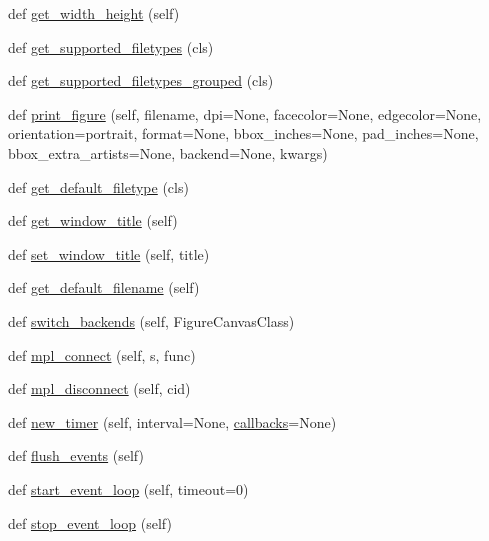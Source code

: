 \begin{DoxyCompactItemize}
\item 
def \hyperlink{classmatplotlib_1_1backend__bases_1_1FigureCanvasBase_a4db06231bf4e60e5192fe7675073c738}{get\+\_\+width\+\_\+height} (self)
\item 
def \hyperlink{classmatplotlib_1_1backend__bases_1_1FigureCanvasBase_aa11460e76b6d77d7bb916006d42d7244}{get\+\_\+supported\+\_\+filetypes} (cls)
\item 
def \hyperlink{classmatplotlib_1_1backend__bases_1_1FigureCanvasBase_a30987b6730be81ad4858f80d32fcf74b}{get\+\_\+supported\+\_\+filetypes\+\_\+grouped} (cls)
\item 
def \hyperlink{classmatplotlib_1_1backend__bases_1_1FigureCanvasBase_a06fd5e9dff8de0b56e06d47b314decd2}{print\+\_\+figure} (self, filename, dpi=None, facecolor=None, edgecolor=None, orientation=\textquotesingle{}portrait\textquotesingle{}, format=None, bbox\+\_\+inches=None, pad\+\_\+inches=None, bbox\+\_\+extra\+\_\+artists=None, backend=None, kwargs)
\item 
def \hyperlink{classmatplotlib_1_1backend__bases_1_1FigureCanvasBase_ab5e20184eb2d8f7c54dd90ada025a970}{get\+\_\+default\+\_\+filetype} (cls)
\item 
def \hyperlink{classmatplotlib_1_1backend__bases_1_1FigureCanvasBase_a4561b78c20faaffa400447c617a55efb}{get\+\_\+window\+\_\+title} (self)
\item 
def \hyperlink{classmatplotlib_1_1backend__bases_1_1FigureCanvasBase_ac8e6616b8dbdcf23cbc3dd3a6032fbb6}{set\+\_\+window\+\_\+title} (self, title)
\item 
def \hyperlink{classmatplotlib_1_1backend__bases_1_1FigureCanvasBase_a5c2424c42bbdae1c4a00104f1697e053}{get\+\_\+default\+\_\+filename} (self)
\item 
def \hyperlink{classmatplotlib_1_1backend__bases_1_1FigureCanvasBase_a8bdc9749f4f279b76259e5b956224ccd}{switch\+\_\+backends} (self, Figure\+Canvas\+Class)
\item 
def \hyperlink{classmatplotlib_1_1backend__bases_1_1FigureCanvasBase_a26e2df80d5806ac01ca7fe5ae4d0ec87}{mpl\+\_\+connect} (self, s, func)
\item 
def \hyperlink{classmatplotlib_1_1backend__bases_1_1FigureCanvasBase_a02c15e6f3e9e3daa0835733a09c76e34}{mpl\+\_\+disconnect} (self, cid)
\item 
def \hyperlink{classmatplotlib_1_1backend__bases_1_1FigureCanvasBase_a05d647b2f0deca6f8bdfd6f66e2a38fa}{new\+\_\+timer} (self, interval=None, \hyperlink{classmatplotlib_1_1backend__bases_1_1FigureCanvasBase_a77f57c5506fc8cc335a756d19367cd82}{callbacks}=None)
\item 
def \hyperlink{classmatplotlib_1_1backend__bases_1_1FigureCanvasBase_ae27a5ffc8f879551b915dbb0ea97e668}{flush\+\_\+events} (self)
\item 
def \hyperlink{classmatplotlib_1_1backend__bases_1_1FigureCanvasBase_a8bffb5998719355fb08564ac8212753f}{start\+\_\+event\+\_\+loop} (self, timeout=0)
\item 
def \hyperlink{classmatplotlib_1_1backend__bases_1_1FigureCanvasBase_a1136b1dd8e4d7cdf02ce2410d9af67f2}{stop\+\_\+event\+\_\+loop} (self)
\end{DoxyCompactItemize}
